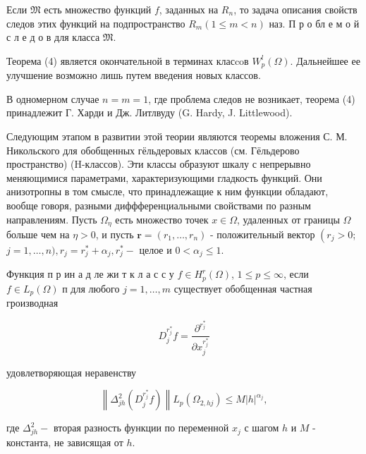 \documentclass[10pt]{article}
\begin{document}
Если $\mathfrak{M}$ есть множество функций $f$, заданных на $R_{n}$, то задача описания свойств следов этих функций на подпространство $R_{m}(1 \leqslant m<n)$ наз. П р о бл е м о й с л е д о в для класса $\mathfrak{M}$.



Теорема (4) является окончательной в терминах класcoв $W_{p}^{l}(\Omega)$. Дальнейшее ее улучшение возможно лишь путем введения новых классов.



В одномерном случае $n=m=1$, где проблема следов не возникает, теорема (4) принадлежит Г. Харди и Дж. Литлвуду (G. Hardy, J. Littlewood).



Следующим этапом в развитии этой теории являются теоремы вложения С. М. Никольского для обобщенных гёльдеровых классов (см. Гёльдерово пространство) (H-классов). Эти классы образуют шкалу с непрерывно меняющимися параметрами, характеризующими гладкость функций. Они анизотропны в том смысле, что принадлежащие к ним функции обладают, вообще говоря, разными диффференциальными свойствами по разным направлениям. Пусть $\Omega_{\eta}$ есть множество точек $x \in \Omega$, удаленных от границы $\Omega$ больше чем на $\eta>0$, и пусть $\boldsymbol{r}=\left(r_{1}, \ldots, r_{n}\right)$ - положительный вектор $\left(r_{j}>0\right.$; $j=1, \ldots, n), r_{j}=r_{j}^{*}+\alpha_{j}, r_{j}^{*}-$ целое и $0<\alpha_{j} \leqslant 1$.



Функция п р ин а д ле жи т к л а с с у $f \in H_{p}^{r}(\Omega)$, $1 \leqslant p \leqslant \infty$, если $f \in L_{p}(\Omega)$ п для любого $j=1, \ldots, m$ существует обобщенная частная гроизводная



\[

D_{j}^{r_{j}^{*}} f=\frac{\partial^{r_{j}^{*}}}{\partial x_{j}^{r_{j}^{*}}}

\]



удовлетворяющая неравенству



\[

\left\|\Delta_{j h}^{2}\left(D_{j}^{r_{j}^{*}} f\right)\right\| L_{p}\left(\Omega_{2, h j}\right) \leqslant M|h|^{\alpha_{j}},

\]



где $\Delta_{j h}^{2}-$ вторая разность функции по переменной $x_{j}$ с шагом $h$ и $M$ - константа, не зависящая от $h$.
\end{document}
